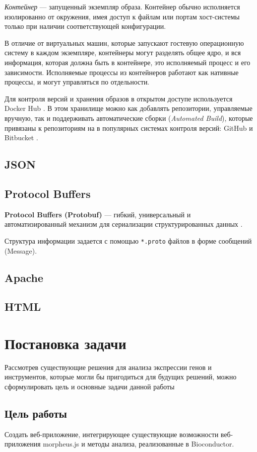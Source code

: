 \documentclass[specification,annotation]{itmo-student-thesis}
\begin{document}
\textit{Контейнер} --- запущенный экземпляр образа. Контейнер обычно исполняется изолированно от окружения, имея доступ к файлам или портам хост-системы только при наличии соответствующей конфигурации.

В отличие от виртуальных машин, которые запускают гостевую операционную систему в каждом экземпляре, контейнеры могут разделять общее ядро, и вся информация, которая должна быть в контейнере, это исполняемый процесс и его зависимости. Исполняемые процессы из контейнеров работают как нативные процессы, и могут управляться по отдельности. 

Для контроля версий и хранения образов в открытом доступе используется Docker Hub \cite{dhub}. В этом хранилище можно как добавлять репозитории, управляемые вручную, так и поддерживать автоматические сборки (\textit{Automated Build}), которые привязаны к репозиториям на в популярных системах контроля версий: GitHub \cite{github} и Bitbucket \cite{bitbucket}.

\subsection{JSON}
\subsection{Protocol Buffers}
\textbf{Protocol Buffers (Protobuf)} --- гибкий, универсальный и автоматизированный механизм для сериализации структурированных данных \cite{protobuf}.

Структура информации задается с помощью \texttt{*.proto} файлов в форме сообщений (Message).

\subsection{Apache}
\subsection{HTML}

\section{Постановка задачи}
Рассмотрев существующие решения для анализа экспрессии генов и инструментов, которые могли бы пригодиться для будущих решений, можно сформулировать цель и основные задачи данной работы

\subsection{Цель работы}
Создать веб-приложение, интегрирующее существующие возможности веб-приложения morpheus.js и методы анализа, реализованные в Bioconductor.
\end{document}

